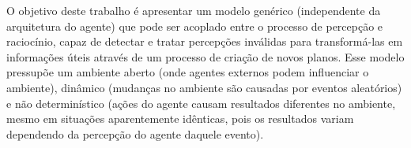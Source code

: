 O objetivo deste trabalho é apresentar um modelo genérico (independente da arquitetura do agente) que pode ser acoplado entre o processo de percepção e raciocínio, capaz de detectar e tratar percepções inválidas para transformá-las em informações úteis através de um processo de criação de novos planos. Esse modelo pressupõe um ambiente aberto (onde agentes externos podem influenciar o ambiente), dinâmico (mudanças no ambiente são causadas por eventos aleatórios) e não determinístico (ações do agente causam resultados diferentes no ambiente, mesmo em situações aparentemente idênticas, pois os resultados variam dependendo da percepção do agente daquele evento).  